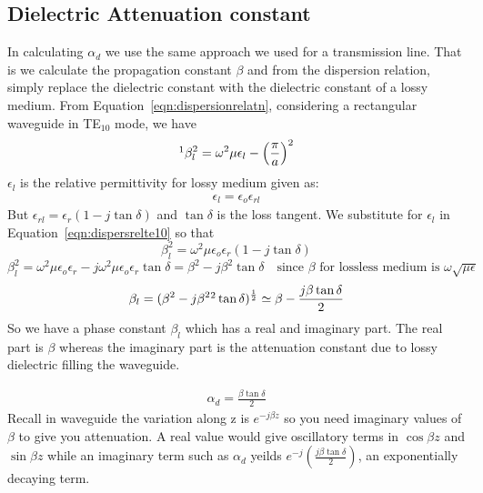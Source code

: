\subsection{Dielectric Attenuation constant}
In calculating  $\alpha_{d}$ we use the same approach we used for a transmission line. That is we calculate the propagation constant $\beta$ and from the dispersion relation, simply replace the dielectric constant with the dielectric constant of a lossy medium. From Equation~\eqref{eqn:dispersionrelatn}, considering a rectangular waveguide in TE$_{10}$ mode, we have
\begin{equation}
\footnotemark\beta_l^{2} = \omega^{2}\mu\epsilon_{l} -\left(\frac{\pi}{a}\right)^{2}
\label{eqn:dispersrelte10}
\end{equation}
$\epsilon_{l}$ is the relative permittivity for lossy medium given as:
\begin{align*}
\epsilon_{l} = \epsilon_{o}\epsilon_{rl}
\end{align*}
But $\epsilon_{rl} = \epsilon_{r}(1-j\tan\delta)$ and $\tan\delta$ is the loss tangent. We substitute for $\epsilon_{l}$ in Equation~\eqref{eqn:dispersrelte10} so that
\begin{equation*}
\beta^{2}_{l} = \omega^{2}\mu\epsilon_{o}\epsilon_{r}(1-j\tan\delta)
\end{equation*}
\begin{dmath*}
\beta^{2}_{l} = \omega^{2}\mu\epsilon_{o}\epsilon_{r} - j\omega^{2}\mu\epsilon_{o}\epsilon_{r}\tan\delta
= \beta^{2} - j\beta^{2}\tan\delta\quad\text{since $\beta$ for lossless medium is $\omega\sqrt{\mu\epsilon}$}
\end{dmath*}
\begin{dmath}
\beta_{l} = (\beta^{2} - j\beta^{2}\footnotemark\tan\delta)^{\frac{1}{2}}
\simeq \beta - \frac{j\beta\tan\delta}{2}
\end{dmath}
So we have a phase constant $\beta_{l}$ which has a real and imaginary part. The real part is $\beta$ whereas the imaginary part is the attenuation constant due to lossy dielectric filling the waveguide.

\begin{align}
\alpha_{d} = \frac{\beta\tan\delta}{2}
\label{eqn:alphad}
\end{align}
Recall in waveguide the variation along z is $e^{-j\beta z}$ so you need imaginary values of $\beta$ to give you attenuation. A real value would give oscillatory terms in $\cos\beta z$ and $\sin\beta z$ while an imaginary term such as $\alpha_d$ yeilds $e^{-j}(\frac{j\beta\tan\delta}{2})$, an exponentially decaying term.


